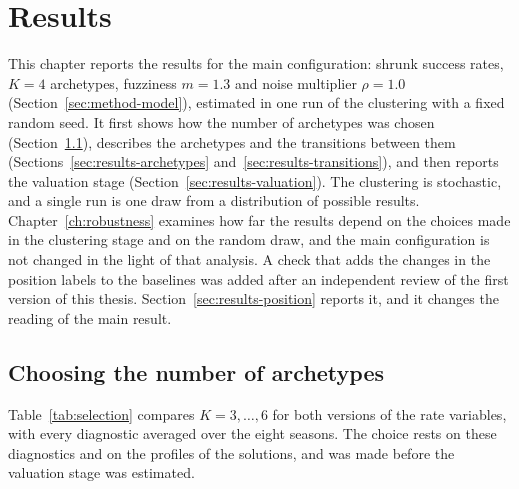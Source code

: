 \chapter{Results}
\label{ch:results}

This chapter reports the results for the main configuration: shrunk success rates, $K=4$ archetypes, fuzziness $m=1.3$ and noise multiplier $\rho=1.0$ (Section~\ref{sec:method-model}), estimated in one run of the clustering with a fixed random seed. It first shows how the number of archetypes was chosen (Section~\ref{sec:results-selection}), describes the archetypes and the transitions between them (Sections~\ref{sec:results-archetypes} and~\ref{sec:results-transitions}), and then reports the valuation stage (Section~\ref{sec:results-valuation}). The clustering is stochastic, and a single run is one draw from a distribution of possible results. Chapter~\ref{ch:robustness} examines how far the results depend on the choices made in the clustering stage and on the random draw, and the main configuration is not changed in the light of that analysis. A check that adds the changes in the position labels to the baselines was added after an independent review of the first version of this thesis. Section~\ref{sec:results-position} reports it, and it changes the reading of the main result.

\section{Choosing the number of archetypes}
\label{sec:results-selection}

Table~\ref{tab:selection} compares $K=3,\dots,6$ for both versions of the rate variables, with every diagnostic averaged over the eight seasons. The choice rests on these diagnostics and on the profiles of the solutions, and was made before the valuation stage was estimated.

